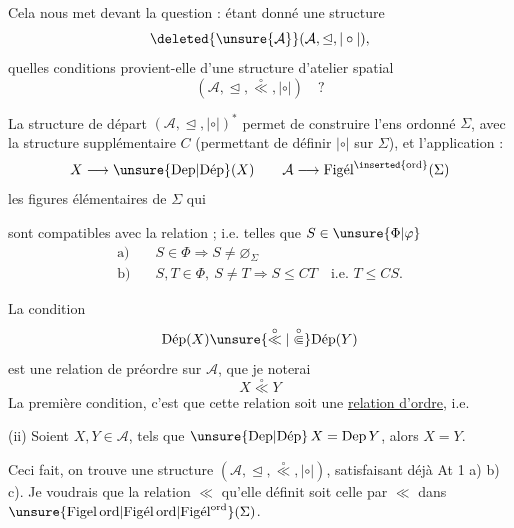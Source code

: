Cela nous met devant la question : étant donné une structure
\[
\deleted{\unsure{\mathcal A}}(\mathcal A,\trianglelefteq,\mathrel{|\circ|}),
\]
 quelles conditions provient-elle d'une structure d'atelier spatial
\[
(\mathcal A,\trianglelefteq,\overset{\circ}{\ll},\mathrel{|\circ|})\quad ?
\]

La structure de départ $(\mathcal A,\trianglelefteq,\mathrel{|\circ|})^{*}$ permet de construire l'ens ordonné $\Sigma$, avec la structure supplémentaire $C$ (permettant de définir $\mathrel{|\circ|}$ sur $\Sigma$), et l'application :
\[
X\longrightarrow\unsure{\mathrm{Dep}|\mathrm{D\acute{e}p}}(X)\qquad \mathcal A\longrightarrow\mathrm{Fig\acute{e}l}^{\inserted{\mathrm{ord}}}(\Sigma)
\]
  les figures élémentaires  de $\Sigma$ qui

sont compatibles avec la relation  ;  i.e. telles que  $S\in\unsure{\Phi|\varphi}$
\[
\begin{aligned}
\text{a)}\quad&S\in\Phi\Longrightarrow S\ne\varnothing_\Sigma\\
\text{b)}\quad&S,T\in\Phi,\ S\ne T\Longrightarrow S\leq CT\quad\text{i.e. }T\leq CS.
\end{aligned}
\]

La condition
\[
\mathrm{D\acute{e}p}(X)\unsure{\overset{\circ}{\ll}|\overset{\circ}{\Subset}}\mathrm{D\acute{e}p}(Y)
\]
est une relation de préordre sur $\mathcal A$, que je noterai
\[
X\overset{\circ}{\ll}Y
\]
La première condition, c'est que cette relation soit une \uline{relation d'ordre}, i.e. 

(ii) Soient $X,Y\in\mathcal A$, tels que $\unsure{\mathrm{Dep}|\mathrm{D\acute{e}p}}\,X=\mathrm{Dep}\,Y$, alors $X=Y$.

Ceci fait, on trouve une structure $(\mathcal A,\trianglelefteq,\overset{\circ}{\ll},\mathrel{|\circ|})$, satisfaisant déjà At 1 a) b) c). Je voudrais que la relation $\ll$ qu'elle définit soit celle   par $\ll$ dans $\unsure{\mathrm{Figel}\,\mathrm{ord}|\mathrm{Fig\acute{e}l}\,\mathrm{ord}|\mathrm{Fig\acute{e}l}^{\mathrm{ord}}}(\Sigma)$.

